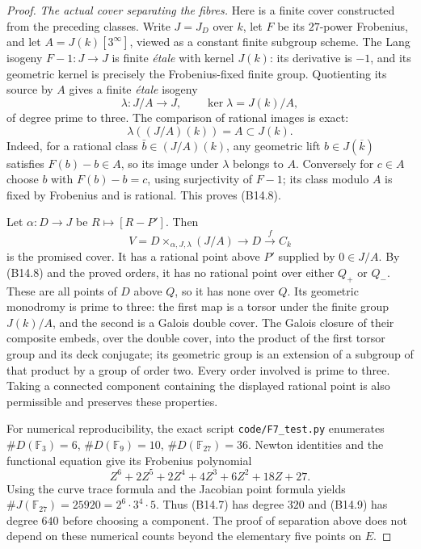 \begin{proof}
\emph{The actual cover separating the fibres.}
Here is a finite cover constructed from the preceding classes.
Write $J=J_D$ over $k$, let $F$ be its $27$-power Frobenius,
and let $A=J(k)[3^\infty]$, viewed as a constant finite subgroup
scheme. The Lang isogeny $F-1:J\to J$ is finite \emph{\'etale}
with kernel $J(k)$: its derivative is $-1$, and its geometric
kernel is precisely the Frobenius-fixed finite group. Quotienting
its source by $A$ gives a finite \emph{\'etale} isogeny
\[
           \lambda:J/A\longrightarrow J,
           \qquad \ker\lambda=J(k)/A,
 \tag{B14.7}
\]
of degree prime to three. The comparison of rational images is
exact:
\[
                     \lambda((J/A)(k))=A\subset J(k).
 \tag{B14.8}
\]
Indeed, for a rational class $\bar b\in(J/A)(k)$, any geometric
lift $b\in J(\overline k)$ satisfies $F(b)-b\in A$, so its image
under $\lambda$ belongs to $A$. Conversely for $c\in A$ choose
$b$ with $F(b)-b=c$, using surjectivity of $F-1$; its class modulo
$A$ is fixed by Frobenius and is rational. This proves (B14.8).

Let $\alpha:D\to J$ be $R\mapsto[R-P']$. Then
\[
             V=D\times_{\alpha,J,\lambda}(J/A)
               \longrightarrow D\xrightarrow{f}C_k
 \tag{B14.9}
\]
is the promised cover. It has a rational point above $P'$ supplied
by $0\in J/A$. By (B14.8) and the proved orders, it has no rational
point over either $Q_+$ or $Q_-$. These are all points of $D$
above $Q$, so it has none over $Q$. Its geometric monodromy is
prime to three: the first map is a torsor under the finite group
$J(k)/A$, and the second is a Galois double cover. The Galois
closure of their composite embeds, over the double cover, into the
product of the first torsor group and its deck conjugate; its
geometric group is an extension of a subgroup of that product by
a group of order two. Every order involved is prime to three.
Taking a connected component containing the displayed rational
point is also permissible and preserves these properties.

For numerical reproducibility, the exact script
\texttt{code/F7\_test.py} enumerates
$\#D(\mathbb F_3)=6$, $\#D(\mathbb F_9)=10$,
$\#D(\mathbb F_{27})=36$. Newton identities and the functional
equation give its Frobenius polynomial
\[
 Z^6+2Z^5+2Z^4+4Z^3+6Z^2+18Z+27.
\]
Using the curve trace formula and the Jacobian point formula
\cite[III, Theorem 11.1; II, Theorem 1.1]{AB_MilneAV} yields
$\#J(\mathbb F_{27})=25920=2^6\cdot3^4\cdot5$.
Thus (B14.7) has degree $320$ and (B14.9) has degree $640$
before choosing a component. The proof of separation above does
not depend on these numerical counts beyond the elementary five
points on $E$.


\end{proof}
